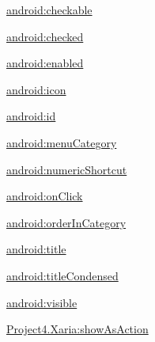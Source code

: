 {\ttfamily \hyperlink{classproject4_1_1xaria_1_1R_1_1styleable_a6db17e4fd6d4d5c9afd707369ba1b57e}{android\+:checkable}}

{\ttfamily \hyperlink{classproject4_1_1xaria_1_1R_1_1styleable_aab5272133c6c4ac6e0192fd2732a95b7}{android\+:checked}}

{\ttfamily \hyperlink{classproject4_1_1xaria_1_1R_1_1styleable_a020dd31aa0835cbf2154f437b30f8112}{android\+:enabled}}

{\ttfamily \hyperlink{classproject4_1_1xaria_1_1R_1_1styleable_a628a1007379fdf99ddcec87c55a86e35}{android\+:icon}}

{\ttfamily \hyperlink{classproject4_1_1xaria_1_1R_1_1styleable_ab6868d10b29e450bcfb02c2f597a71b6}{android\+:id}}

{\ttfamily \hyperlink{classproject4_1_1xaria_1_1R_1_1styleable_af46cfe726f92832e0764981044beda57}{android\+:menu\+Category}}

{\ttfamily \hyperlink{classproject4_1_1xaria_1_1R_1_1styleable_ae2e9861ee0e27e73ac735e1186c10eba}{android\+:numeric\+Shortcut}}

{\ttfamily \hyperlink{classproject4_1_1xaria_1_1R_1_1styleable_ae290bec2869c281c693e4b84883cb6b9}{android\+:on\+Click}}

{\ttfamily \hyperlink{classproject4_1_1xaria_1_1R_1_1styleable_ae2a0816c4c9b67480600cac4a4fc9282}{android\+:order\+In\+Category}}

{\ttfamily \hyperlink{classproject4_1_1xaria_1_1R_1_1styleable_a386f2f1153e5a68c43202e15a0d95317}{android\+:title}}

{\ttfamily \hyperlink{classproject4_1_1xaria_1_1R_1_1styleable_af594043a31da455b0789db1f3a3fbef2}{android\+:title\+Condensed}}

{\ttfamily \hyperlink{classproject4_1_1xaria_1_1R_1_1styleable_af028a1cfa670b4bc1eae5a3ccd4db34e}{android\+:visible}}

{\ttfamily \hyperlink{classproject4_1_1xaria_1_1R_1_1styleable_a8388052a0c350c264867c69c217d9cb3}{Project4.\+Xaria\+:show\+As\+Action}}

